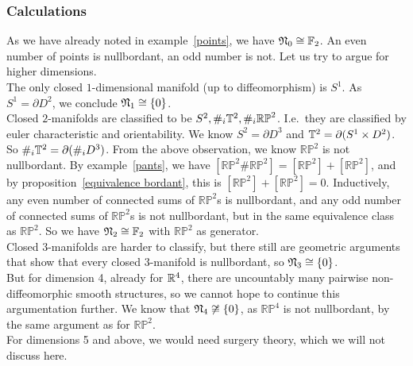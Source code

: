 \documentclass[a4paper,12pt]{article}
\begin{document}
\subsubsection{Calculations}


As we have already noted in example\ \ref{points}, we have \(\mathfrak{N}_0\cong\mathbb{F}_2\). An even number of points is nullbordant, an odd number is not. Let us try to argue for higher dimensions.\\
The only closed \(1\)-dimensional manifold (up to diffeomorphism) is \(S^1\). As \(S^1=\partial D^2\), we conclude \(\mathfrak{N}_1\cong \{0\}\).\\
Closed \(2\)-manifolds are classified to be \(S^2, \#_i\mathbb{T}^2, \#_i\mathbb{RP}^2\). I.e.\ they are classified by euler characteristic and orientability. We know \(S^2=\partial D^3\) and \(\mathbb{T}^2=\partial (S^1\times D^2)\). So \(\#_i\mathbb{T}^2=\partial(\#_i D^3)\). From the above observation, we know \(\mathbb{RP}^2\) is not nullbordant. 
By example\ \ref{pants}, we have \([\mathbb{RP}^2\#\mathbb{RP}^2]=[\mathbb{RP}^2]+[\mathbb{RP}^2]\), and by proposition\ \ref{equivalence bordant}, this is \([\mathbb{RP}^2]+[\mathbb{RP}^2]=0\). Inductively, any even number of connected sums of \(\mathbb{RP}^2\)s is nullbordant, and any odd number of connected sums of \(\mathbb{RP}^2\)s is not nullbordant, but in the same equivalence class as \(\mathbb{RP}^2\). So we have \(\mathfrak{N}_2\cong\mathbb{F}_2\) with \(\mathbb{RP}^2\) as generator.\\
Closed \(3\)-manifolds are harder to classify, but there still are geometric arguments that show that every closed \(3\)-manifold is nullbordant, so \(\mathfrak{N}_3\cong\{0\}\).\\
But for dimension 4, already for \(\mathbb{R}^4\), there are uncountably many pairwise non-diffeomorphic smooth structures, so we cannot hope to continue this argumentation further. We know that \(\mathfrak{N}_4\not\cong\{0\}\), as \(\mathbb{RP}^4\) is not nullbordant, by the same argument as for \(\mathbb{RP}^2\).\\
For dimensions 5 and above, we would need surgery theory, which we will not discuss here.
\end{document}
